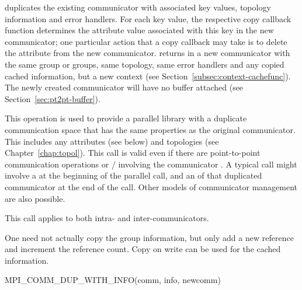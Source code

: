  duplicates the
existing communicator  with
associated key values, topology information and error handlers.
For each key value, the respective copy callback
function determines the attribute value associated with this key in the
new communicator; one particular action that a copy callback may take
is to delete the attribute from the new communicator.
 returns in  a new
communicator with the same group or groups, same
topology, same error handlers and any copied cached information,
but a new context (see Section~\ref{subsec:context-cachefunc}).
The newly created communicator will have no buffer attached (see Section~\ref{sec:pt2pt-buffer}).


\begin{users}
This operation is used to provide a parallel library
with a duplicate
communication
space that has the same properties as the original communicator. This
includes any attributes (see below) and topologies (see
Chapter~\ref{chap:topol}). This call is valid even if there are
point-to-point communication operations
or  \MPI/  involving
the communicator
. A typical call might involve a 
at the beginning of the parallel call, and an  of
that duplicated communicator at the end of the call. Other models
of communicator management are also possible.

This call applies to both intra- and inter-communicators.
\end{users}

\begin{implementors}
One need not actually copy the group information, but only add a new reference
and increment the reference count. Copy on write can be used for the cached
information.\end{implementors}

%
\begin{funcdef}{MPI\_COMM\_DUP\_WITH\_INFO}{(\mbox{comm}, \mbox{info}, \mbox{newcomm})}
\end{funcdef}

